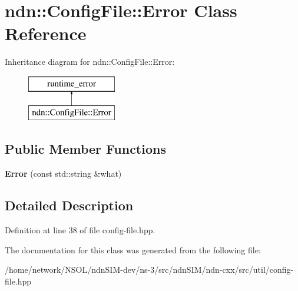 \hypertarget{classndn_1_1ConfigFile_1_1Error}{}\section{ndn\+:\+:Config\+File\+:\+:Error Class Reference}
\label{classndn_1_1ConfigFile_1_1Error}
Inheritance diagram for ndn\+:\+:Config\+File\+:\+:Error\+:\begin{figure}[H]
\begin{center}
\leavevmode
\includegraphics[height=2.000000cm]{classndn_1_1ConfigFile_1_1Error}
\end{center}
\end{figure}
\subsection*{Public Member Functions}
\begin{DoxyCompactItemize}
\item 
{\bfseries Error} (const std\+::string \&what)\hypertarget{classndn_1_1ConfigFile_1_1Error_aded4e916155984e0cebcef6533acfb74}{}\label{classndn_1_1ConfigFile_1_1Error_aded4e916155984e0cebcef6533acfb74}

\end{DoxyCompactItemize}


\subsection{Detailed Description}


Definition at line 38 of file config-\/file.\+hpp.



The documentation for this class was generated from the following file\+:\begin{DoxyCompactItemize}
\item 
/home/network/\+N\+S\+O\+L/ndn\+S\+I\+M-\/dev/ns-\/3/src/ndn\+S\+I\+M/ndn-\/cxx/src/util/config-\/file.\+hpp\end{DoxyCompactItemize}
